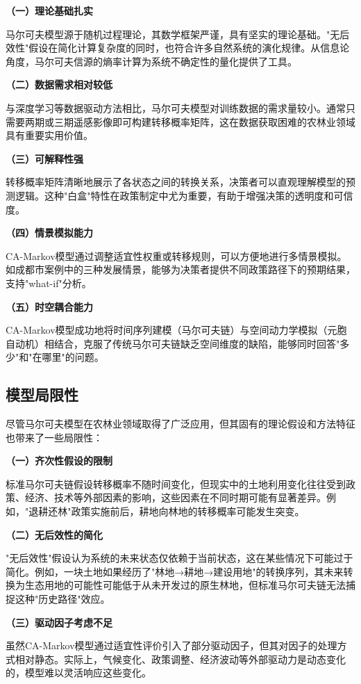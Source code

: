 \documentclass[a4paper,12pt]{ctexart}
\begin{document}
\textbf{（一）理论基础扎实}

马尔可夫模型源于随机过程理论，其数学框架严谨，具有坚实的理论基础。"无后效性"假设在简化计算复杂度的同时，也符合许多自然系统的演化规律。从信息论角度，马尔可夫信源的熵率计算为系统不确定性的量化提供了工具。

\textbf{（二）数据需求相对较低}

与深度学习等数据驱动方法相比，马尔可夫模型对训练数据的需求量较小。通常只需要两期或三期遥感影像即可构建转移概率矩阵，这在数据获取困难的农林业领域具有重要实用价值。

\textbf{（三）可解释性强}

转移概率矩阵清晰地展示了各状态之间的转换关系，决策者可以直观理解模型的预测逻辑。这种"白盒"特性在政策制定中尤为重要，有助于增强决策的透明度和可信度。

\textbf{（四）情景模拟能力}

CA-Markov模型通过调整适宜性权重或转移规则，可以方便地进行多情景模拟。如成都市案例中的三种发展情景，能够为决策者提供不同政策路径下的预期结果，支持"what-if"分析。

\textbf{（五）时空耦合能力}

CA-Markov模型成功地将时间序列建模（马尔可夫链）与空间动力学模拟（元胞自动机）相结合，克服了传统马尔可夫链缺乏空间维度的缺陷，能够同时回答"多少"和"在哪里"的问题。

\subsection{模型局限性}

尽管马尔可夫模型在农林业领域取得了广泛应用，但其固有的理论假设和方法特征也带来了一些局限性：

\textbf{（一）齐次性假设的限制}

标准马尔可夫链假设转移概率不随时间变化，但现实中的土地利用变化往往受到政策、经济、技术等外部因素的影响，这些因素在不同时期可能有显著差异。例如，"退耕还林"政策实施前后，耕地向林地的转移概率可能发生突变。

\textbf{（二）无后效性的简化}

"无后效性"假设认为系统的未来状态仅依赖于当前状态，这在某些情况下可能过于简化。例如，一块土地如果经历了"林地→耕地→建设用地"的转换序列，其未来转换为生态用地的可能性可能低于从未开发过的原生林地，但标准马尔可夫链无法捕捉这种"历史路径"效应。

\textbf{（三）驱动因子考虑不足}

虽然CA-Markov模型通过适宜性评价引入了部分驱动因子，但其对因子的处理方式相对静态。实际上，气候变化、政策调整、经济波动等外部驱动力是动态变化的，模型难以灵活响应这些变化。
\end{document}
